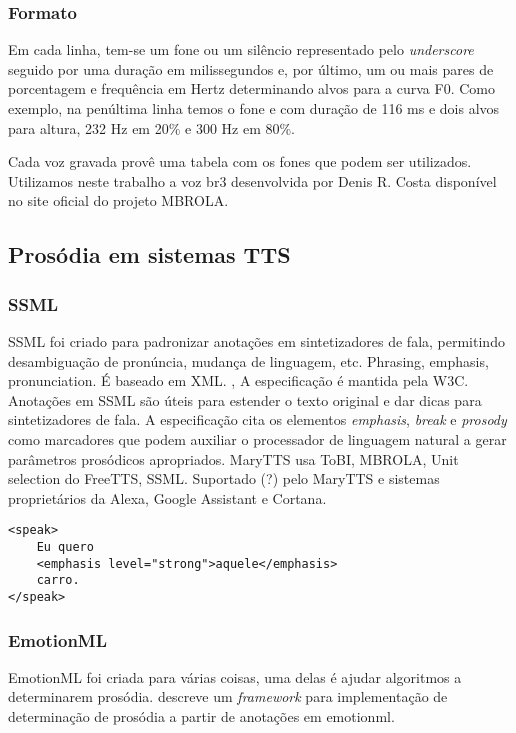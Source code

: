 \subsubsection{Formato}
Em cada linha, tem-se um fone ou um silêncio representado pelo \emph{underscore} seguido por uma duração em milissegundos e, por último, um ou mais pares de porcentagem e frequência em Hertz determinando alvos para a curva F0. Como exemplo, na penúltima linha temos o fone \/e\/ com duração de 116 ms e dois alvos para altura, 232 Hz em 20\% e 300 Hz em 80\%.

Cada voz gravada provê uma tabela com os fones que podem ser utilizados. Utilizamos neste trabalho a voz br3 desenvolvida por Denis R. Costa disponível no site oficial do projeto MBROLA.

\subsection{Prosódia em sistemas TTS}
\subsubsection{SSML}
SSML foi criado para padronizar anotações em sintetizadores de fala, permitindo
desambiguação de pronúncia, mudança de linguagem, etc. Phrasing, emphasis,
pronunciation. É baseado em XML.
\cite{ssml}, A especificação é mantida pela W3C.
Anotações em SSML são úteis para estender o texto original e dar dicas para
sintetizadores de fala. A especificação cita os elementos \emph{emphasis},
\emph{break} e \emph{prosody} como marcadores que podem auxiliar o processador
de linguagem natural a gerar parâmetros prosódicos apropriados.
MaryTTS usa ToBI, MBROLA, Unit selection do FreeTTS, SSML.
Suportado (?) pelo MaryTTS e sistemas proprietários da Alexa, Google Assistant e Cortana.

\begin{lstlisting}
<speak>
    Eu quero
    <emphasis level="strong">aquele</emphasis> 
    carro.
</speak> 
\end{lstlisting}

\subsubsection{EmotionML}
EmotionML \cite{emotionml} foi criada para várias coisas, uma delas é ajudar
algoritmos a determinarem prosódia. \cite{emotionmary} descreve um
\emph{framework} para implementação de determinação de prosódia a partir de
anotações em emotionml.


